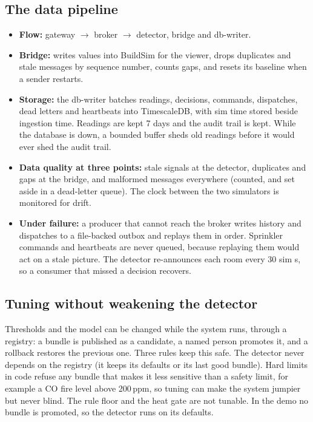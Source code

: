 \documentclass[11pt]{article}
\providecommand{\tightlist}{\setlength{\itemsep}{0pt}\setlength{\parskip}{0pt}}
\begin{document}
\subsection{The data pipeline}
\begin{itemize}\tightlist
\item \textbf{Flow:} gateway $\to$ broker $\to$ detector, bridge and db-writer.
\item \textbf{Bridge:} writes values into BuildSim for the viewer, drops duplicates and stale messages by sequence number, counts gaps, and resets its baseline when a sender restarts.
\item \textbf{Storage:} the db-writer batches readings, decisions, commands, dispatches, dead letters and heartbeats into TimescaleDB, with sim time stored beside ingestion time. Readings are kept 7 days and the audit trail is kept. While the database is down, a bounded buffer sheds old readings before it would ever shed the audit trail.
\item \textbf{Data quality at three points:} stale signals at the detector, duplicates and gaps at the bridge, and malformed messages everywhere (counted, and set aside in a dead-letter queue). The clock between the two simulators is monitored for drift.
\item \textbf{Under failure:} a producer that cannot reach the broker writes history and dispatches to a file-backed outbox and replays them in order. Sprinkler commands and heartbeats are never queued, because replaying them would act on a stale picture. The detector re-announces each room every 30 sim s, so a consumer that missed a decision recovers.
\end{itemize}

\subsection{Tuning without weakening the detector}\label{sec:registry}
Thresholds and the model can be changed while the system runs, through a registry: a bundle is published as a candidate, a named person promotes it, and a rollback restores the previous one. Three rules keep this safe. The detector never depends on the registry (it keeps its defaults or its last good bundle). Hard limits in code refuse any bundle that makes it less sensitive than a safety limit, for example a CO fire level above 200\,ppm, so tuning can make the system jumpier but never blind. The rule floor and the heat gate are not tunable. In the demo no bundle is promoted, so the detector runs on its defaults.
\end{document}
